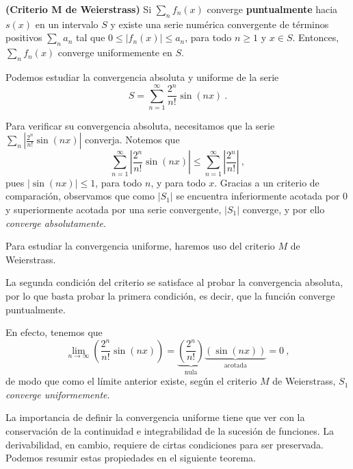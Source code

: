 \begin{defi}{\textbf{(Criterio M de Weierstrass)}}
    Si $\sum\limits_n f_n(x)$ converge \textbf{puntualmente} hacia $s(x)$ en un intervalo $S$ y existe una serie numérica convergente de términos positivos $\sum\limits_n a_n$ tal que $0 \leq |f_n(x)| \leq a_n$, para todo $n \geq 1$ y $x \in S$. Entonces, $\sum\limits_n f_n(x)$ converge uniformemente en $S$.
\end{defi}

\begin{ejemplo}
    Podemos estudiar la convergencia absoluta y uniforme de la serie 
    \begin{equation*}
        S = \sum_{n=1}^\infty \frac{2^n}{n!} \sin(nx) \ .
    \end{equation*}

    Para verificar su convergencia absoluta, necesitamos que la serie $\sum\limits_n \left|\frac{2^n}{n!} \sin(nx)\right|$ converja. Notemos que
    \begin{equation*}
        \sum_{n=1}^\infty \left|\frac{2^n}{n!} \sin(nx)\right| \leq \sum_{n=1}^\infty \left|\frac{2^n}{n!} \right| \ ,
    \end{equation*} 
    pues $|\sin(nx)| \leq 1$, para todo $n$, y para todo $x$. Gracias a un criterio de comparación, observamos que como $|S_1|$ se encuentra inferiormente acotada por 0 y superiormente acotada por una serie convergente, $|S_1|$ converge, y por ello \emph{converge absolutamente}.

    Para estudiar la convergencia uniforme, haremos uso del criterio $M$ de Weierstrass.

    La segunda condición del criterio se satisface al probar la convergencia absoluta, por lo que basta probar la primera condición, es decir, que la función converge puntualmente.

    En efecto, tenemos que 
    \begin{equation*}
        \lim_{n \to \infty} \left( \frac{2^n}{n!} \sin(nx) \right) = \underbrace{\left( \frac{2^n}{n!} \right)}_{\text{nula}} \underbrace{\left( \sin(nx) \right)}_{\text{acotada}} = 0 \ ,
    \end{equation*}
    de modo que como el límite anterior existe, según el criterio $M$ de Weierstrass, $S_1$ \emph{converge uniformemente}.
\end{ejemplo}

La importancia de definir la convergencia uniforme tiene que ver con la conservación de la continuidad e integrabilidad de la sucesión de funciones. La derivabilidad, en cambio, requiere de cirtas condiciones para ser preservada. Podemos resumir estas propiedades en el siguiente teorema.

